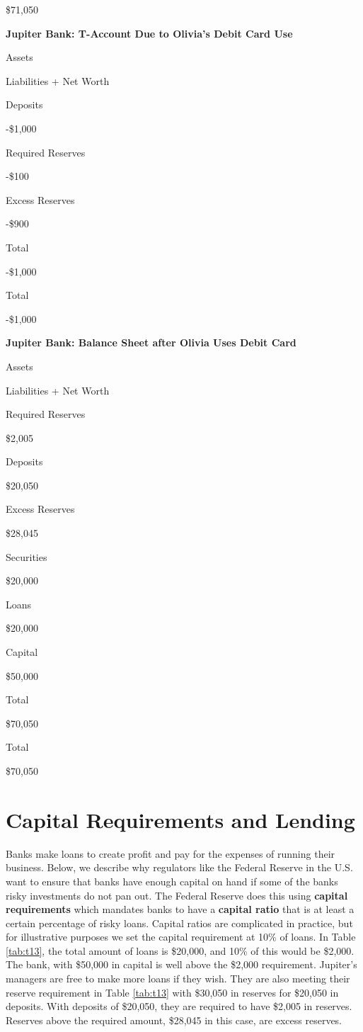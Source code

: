 \documentclass[
]{book}
\begin{document}
\$71,050

\label{tab:t12}\textbf{Jupiter Bank: T-Account Due to Olivia's Debit Card Use}

Assets

Liabilities + Net Worth

Deposits

-\$1,000

Required Reserves

-\$100

Excess Reserves

-\$900

Total

-\$1,000

Total

-\$1,000

\label{tab:t13}\textbf{Jupiter Bank: Balance Sheet after Olivia Uses Debit Card}

Assets

Liabilities + Net Worth

Required Reserves

\$2,005

Deposits

\$20,050

Excess Reserves

\$28,045

Securities

\$20,000

Loans

\$20,000

Capital

\$50,000

Total

\$70,050

Total

\$70,050

\hypertarget{capital-requirements-and-lending}{%
\section{Capital Requirements and Lending}\label{capital-requirements-and-lending}}

Banks make loans to create profit and pay for the expenses of running their business. Below, we describe why regulators like the Federal Reserve in the U.S. want to ensure that banks have enough capital on hand if some of the banks risky investments do not pan out. The Federal Reserve does this using \textbf{capital requirements} which mandates banks to have a \textbf{capital ratio} that is at least a certain percentage of risky loans. Capital ratios are complicated in practice, but for illustrative purposes we set the capital requirement at 10\% of loans. In Table \ref{tab:t13}, the total amount of loans is \$20,000, and 10\% of this would be \$2,000. The bank, with \$50,000 in capital is well above the \$2,000 requirement. Jupiter's managers are free to make more loans if they wish. They are also meeting their reserve requirement in Table \ref{tab:t13} with \$30,050 in reserves for \$20,050 in deposits. With deposits of \$20,050, they are required to have \$2,005 in reserves. Reserves above the required amount, \$28,045 in this case, are excess reserves.
\end{document}
